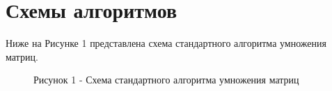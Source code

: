 \documentclass[12pt]{report}
\begin{document}
	\section{Схемы алгоритмов}
	Ниже на Рисунке 1 представлена схема стандартного алгоритма умножения матриц.
	\begin{figure}[h!]
		\caption*{Рисунок 1 - Схема стандартного алгоритма умножения матриц}
	\end{figure}
	
\end{document}
